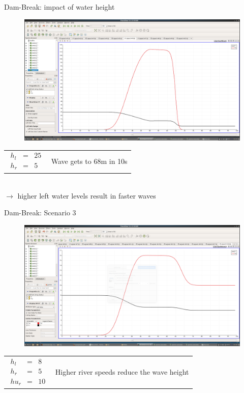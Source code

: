 \documentclass[shortpres]{beamer}
\newcommand{\imgvoffset}{-20pt}
\newcommand{\imgfullscale}{0.75}
\begin{document}
\begin{frame}{Dam-Break: impact of water height}
	\begin{figure}[t]
		\vspace{\imgvoffset}
		\includegraphics[width=\imgfullscale\linewidth]{img/Dam_hl25_hr5.png}
	\end{figure}
	
	\begin{tabular}{m{3cm} m{\linewidth-5cm}}
		$
		\begin{matrix}
		h_l & = & 25\\
		h_r & = & 5
		\end{matrix}
		$
		&
		Wave gets to 68m in 10s
	\end{tabular}
	 \hspace{0pt}\\
	 \centering
	$\rightarrow$ higher left water levels result in faster waves
\end{frame}


\begin{frame}{Dam-Break: Scenario 3}
	\begin{figure}[t]
		\vspace{\imgvoffset}
		\includegraphics[width=\imgfullscale\linewidth]{img/Dam_river.png}
	\end{figure}
	
	\begin{tabular}{m{3cm} m{\linewidth-5cm}}
		$
		\begin{matrix}
		h_l & = & 8\\
		h_r & = & 5\\
		hu_r & = & 10
		\end{matrix}
		$
		&
		
		Higher river speeds reduce the wave height
	\end{tabular}
\end{frame}
\end{document}
